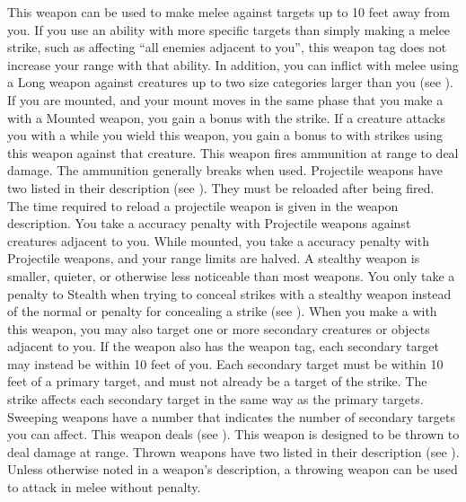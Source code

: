         \label{Long Weapon} This weapon can be used to make melee  against targets up to 10 feet away from you.
        If you use an ability with more specific targets than simply making a melee strike, such as affecting ``all enemies adjacent to you'', this weapon tag does not increase your range with that ability.
        In addition, you can inflict  with melee  using a Long weapon against creatures up to two size categories larger than you (see ).
        \label{Mounted Weapon} If you are mounted, and your mount moves in the same phase that you make a  with a Mounted weapon, you gain a   bonus with the strike.
         If a creature attacks you with a   while you wield this weapon, you  gain a  bonus to  with strikes using this weapon against that creature.
         This weapon fires ammunition at range to deal damage.
        The ammunition generally breaks when used.
        Projectile weapons have two  listed in their description (see ).
        They must be reloaded after being fired.
        The time required to reload a projectile weapon is given in the weapon description.
        You take a  accuracy penalty with Projectile weapons against creatures adjacent to you.
        While mounted, you take a  accuracy penalty with Projectile weapons, and your range limits are halved.
        A stealthy weapon is smaller, quieter, or otherwise less noticeable than most weapons.
        You only take a  penalty to Stealth when trying to conceal strikes with a stealthy weapon instead of the normal  or  penalty for concealing a strike (see ).
        \label{Sweeping} When you make a   with this weapon, you may also target one or more secondary creatures or objects adjacent to you.
        If the weapon also has the  weapon tag, each secondary target may instead be within 10 feet of you.
        Each secondary target must be within 10 feet of a primary target, and must not already be a target of the strike.
        The strike affects each secondary target in the same way as the primary targets.
        Sweeping weapons have a number that indicates the number of secondary targets you can affect.
         This weapon deals  (see ).
         This weapon is designed to be thrown to deal damage at range.
        Thrown weapons have two  listed in their description (see ).
        Unless otherwise noted in a weapon's description, a throwing weapon can be used to attack in melee without penalty.

